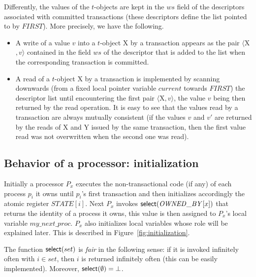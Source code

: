 Differently, the  values of the $t$-objects are kept in the $ws$ field 
of the  descriptors associated with committed transactions
(these descriptors define the list pointed to by $\mathit{FIRST}$). 
More precisely,  we have the following.
\begin{itemize}
\item
A  write of a value $v$ into a $t$-object {\sc X}  by a transaction 
appears as the  pair  $\langle${\sc X}$,v \rangle$ contained in the 
field $ws$ of the descriptor  that is added to the list when the
corresponding transaction is committed. 
\item
A read of a $t$-object {\sc X} by a transaction is implemented by 
scanning  downwards (from a fixed local pointer variable $current$ towards $\mathit{FIRST}$)
the  descriptor list until encountering 
the first pair $\langle${\sc X}$,v \rangle$, the value $v$ being then 
returned by the read operation. It is easy to see that the values read by a 
transaction are always mutually consistent (if the values $v$ and $v'$ are 
returned by the reads of {\sc X} and {\sc Y} issued by the same transaction, 
then the first  value read  was not overwritten when the second one was read). 
\end{itemize}


\subsection{Behavior of a processor: initialization}
Initially a  processor $P_x$ executes the non-transactional code (if any) of each process $p_i$ it owns 
until $p_i$'s first transaction and then 
initializes accordingly the  atomic register
$\mathit{STATE}[i]$. Next  $P_x$ invokes  ${\sf select}(\mathit{OWNED\_BY}[x])$
that returns the identity of a process it owns, this value is then assigned to $P_x$'s local 
variable  $my\_next\_proc$. $P_x$ also initializes local variables
whose role  will be explained later.
This is described in Figure~\ref{fig:initialization}. 


The function ${\sf select}(set)$ is {\it fair} in the following sense:
if it is invoked infinitely often with $i\in set$,  then $i$ is returned
infinitely often (this can be easily implemented).
Moreover, ${\sf select}(\emptyset)=\bot$.  



